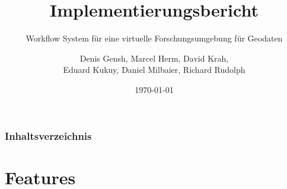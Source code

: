 \documentclass[11pt, usepdftitle=false,...]{beamer}
\author{Denis Gensh, Marcel Herm, David Krah,\\
	Eduard Kukuy, Daniel Milbaier, Richard Rudolph}
\title{
	\textbf{Implementierungsbericht}
}
\subtitle{Workflow System für eine virtuelle Forschungsumgebung für
	Geodaten
	\vspace{-0.7cm}
	}
\institute{\texttt{[image: images/workflow2-tp3.png]}}
\date{\today}
\begin{document}
	{
		\begin{frame}
			\titlepage
		\end{frame}
	}
	
	
	
	\begin{frame}
		\frametitle{Inhaltsverzeichnis}
		\tableofcontents
	\end{frame}
	
	\section{Features}
	\frame{\sectionpage}
	
		
			
\end{document}

